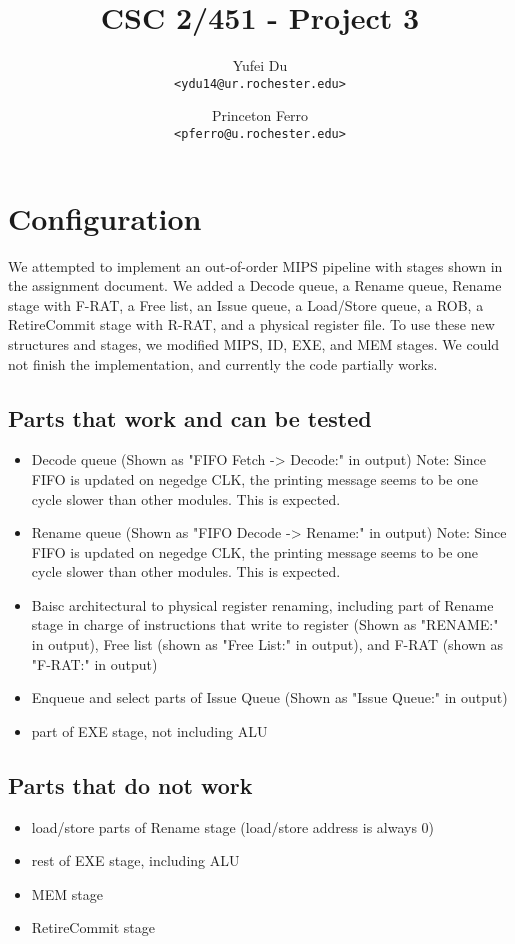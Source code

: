 \documentclass[a4paper,11pt]{article}
\title{CSC 2/451 - Project 3}
\author{
Yufei Du \\
\texttt{<ydu14@ur.rochester.edu>}
\and
Princeton Ferro \\
\texttt{<pferro@u.rochester.edu>}
}
\begin{document}
\maketitle

\section{Configuration}
We attempted to implement an out-of-order MIPS pipeline with stages shown in the assignment document. We added a Decode queue, a Rename queue, Rename stage with F-RAT, a Free list, an Issue queue, a Load/Store queue, a ROB, a RetireCommit stage with R-RAT, and a physical register file. To use these new structures and stages, we modified MIPS, ID, EXE, and MEM stages. We could not finish the implementation, and currently the code partially works.
\subsection{Parts that work and can be tested}
\begin{itemize}
  \item Decode queue (Shown as "FIFO Fetch -> Decode:" in output) Note: Since FIFO is updated on negedge CLK, the printing message seems to be one cycle slower than other modules. This is expected.
  \item Rename queue (Shown as "FIFO Decode -> Rename:" in output) Note: Since FIFO is updated on negedge CLK, the printing message seems to be one cycle slower than other modules. This is expected.
  \item Baisc architectural to physical register renaming, including part of Rename stage in charge of instructions that write to register (Shown as "RENAME:" in output), Free list (shown as "Free List:" in output), and F-RAT (shown as "F-RAT:" in output)
  \item Enqueue and select parts of Issue Queue (Shown as "Issue Queue:" in output)
  \item part of EXE stage, not including ALU
\end{itemize}
\subsection{Parts that do not work}
\begin{itemize}
  \item load/store parts of Rename stage (load/store address is always 0)
  \item rest of EXE stage, including ALU
  \item MEM stage
  \item RetireCommit stage
\end{itemize}
\end{document}
